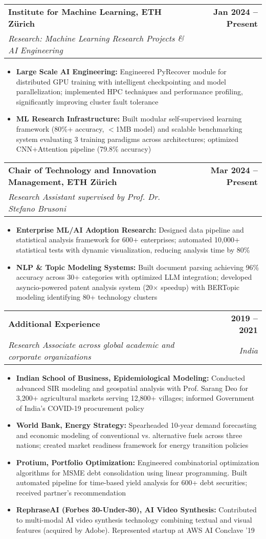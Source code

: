 \documentclass[letterpaper,10pt]{article}
\makeatletter
\newcommand{\resumeItem}[1]{
  \item\small{
    {#1 \vspace{-2pt}}
  }
}
\newcommand{\resumeSubheading}[4]{
  \vspace{-2pt}\item
    \begin{tabular*}{1.0\textwidth}[t]{l@{\extracolsep{\fill}}r}
      \textbf{#1} & \textbf{\small #2} \\
      \textcolor{accentblue}{\textit{\small#3}} & \textit{\small #4} \\
    \end{tabular*}\vspace{-7pt}
}
\newcommand{\resumeItemListStart}{\begin{itemize}}
\newcommand{\resumeItemListEnd}{\end{itemize}\vspace{-5pt}}
\makeatother
\begin{document}
        \resumeSubheading
      {Institute for Machine Learning, ETH Zürich}{Jan 2024 -- Present}
      {Research: Machine Learning Research Projects \& AI Engineering}{}
            \resumeItemListStart
                \resumeItem{\textbf{Large Scale AI Engineering:} Engineered PyRecover module for distributed GPU training with intelligent checkpointing and model parallelization; implemented HPC techniques and performance profiling, significantly improving cluster fault tolerance}
                \resumeItem{\textbf{ML Research Infrastructure:} Built modular self-supervised learning framework (80\%+ accuracy, $<$1MB model) and scalable benchmarking system evaluating 3 training paradigms across architectures; optimized CNN+Attention pipeline (79.8\% accuracy)}
            \resumeItemListEnd

        \resumeSubheading
      {Chair of Technology and Innovation Management, ETH Zürich}{Mar 2024 -- Present}
      {Research Assistant supervised by Prof. Dr. Stefano Brusoni}{}
            \resumeItemListStart
                \resumeItem{\textbf{Enterprise ML/AI Adoption Research:} Designed data pipeline and statistical analysis framework for 600+ enterprises; automated 10,000+ statistical tests with dynamic visualization, reducing analysis time by 80\%}
                \resumeItem{\textbf{NLP \& Topic Modeling Systems:} Built document parsing achieving 96\% accuracy across 30+ categories with optimized LLM integration; developed asyncio-powered patent analysis system (20× speedup) with BERTopic modeling identifying 80+ technology clusters}
      \resumeItemListEnd

    \resumeSubheading
          {Additional Experience}{2019 -- 2021}
          {Research Associate across global academic and corporate organizations}{India}
          \resumeItemListStart
          \resumeItem{\textbf{Indian School of Business, Epidemiological Modeling:} Conducted advanced SIR modeling and geospatial analysis with Prof. Sarang Deo for 3,200+ agricultural markets serving 12,800+ villages; informed Government of India's COVID-19 procurement policy}
          \resumeItem{\textbf{World Bank, Energy Strategy:} Spearheaded 10-year demand forecasting and economic modeling of conventional vs. alternative fuels across three nations; created market readiness framework for energy transition policies}
          \resumeItem{\textbf{Protium, Portfolio Optimization:} Engineered combinatorial optimization algorithms for MSME debt consolidation using linear programming. Built automated pipeline for time-based yield analysis for 600+ debt securities; received partner's recommendation}
          \resumeItem{\textbf{RephraseAI (Forbes 30-Under-30), AI Video Synthesis:} Contributed to multi-modal AI video synthesis technology combining textual and visual features (acquired by Adobe). Represented startup at AWS AI Conclave '19}
          \resumeItemListEnd
\end{document}
